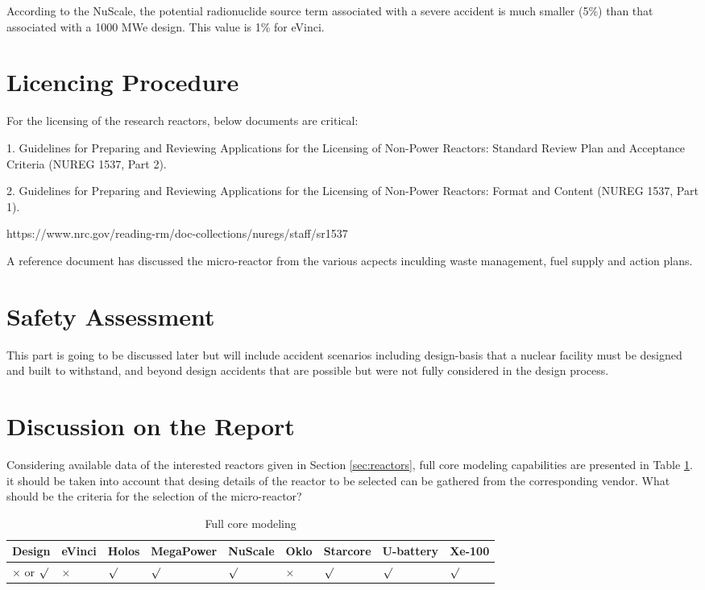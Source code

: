\documentclass[10pt,a4paper]{article}
\begin{document}
According to the NuScale, the potential radionuclide source term associated with a severe accident is much smaller (5\%) than that associated with a 1000 MWe design. This value is 1\% for eVinci. 

\pagebreak
\section{Licencing Procedure}
For the licensing of the research reactors, below documents are critical:

1. Guidelines for Preparing and Reviewing Applications for the Licensing of Non-Power Reactors: Standard Review Plan and Acceptance Criteria (NUREG 1537, Part 2).

2. Guidelines for Preparing and Reviewing Applications for the Licensing of Non-Power Reactors: Format and Content (NUREG 1537, Part 1). 


https://www.nrc.gov/reading-rm/doc-collections/nuregs/staff/sr1537

A reference document \cite{nichol18} has discussed  the micro-reactor from the various acpects inculding waste management, fuel supply and action plans.


\section{Safety Assessment}
This part is going to be discussed later but will include accident scenarios including design-basis that a nuclear facility must be designed and built to withstand, and beyond design accidents that are possible but were not fully considered in the design process.

\section{Discussion on the Report}

Considering available data of the interested reactors given in Section \ref{sec:reactors}, full core modeling capabilities are presented in Table \ref{table:feasiblity}. it should be taken into account that desing details of the reactor to be selected can be gathered from the corresponding vendor. What should be the criteria for the selection of the micro-reactor?

\begin{table} [ht]
\begin{center}

\caption{Full core modeling}
\label{table:feasiblity}
\begin{tabular}{|l|l|l|l|l|l|l|l|l|}
\hline 
Design 		&eVinci 		& Holos		&MegaPower 	& NuScale		& Oklo 		& Starcore		& U-battery 		& Xe-100 \\ 
\hline 
$\times$ or 	$\surd$ 		&  $\times$		& $\surd$		& $\surd$ 	&   $\surd$		&  $\times$		& $\surd$	&  $\surd$ 		&  $\surd$ \\ 
\hline 

\end{tabular}
\end{center}
\end{table}
\end{document}
